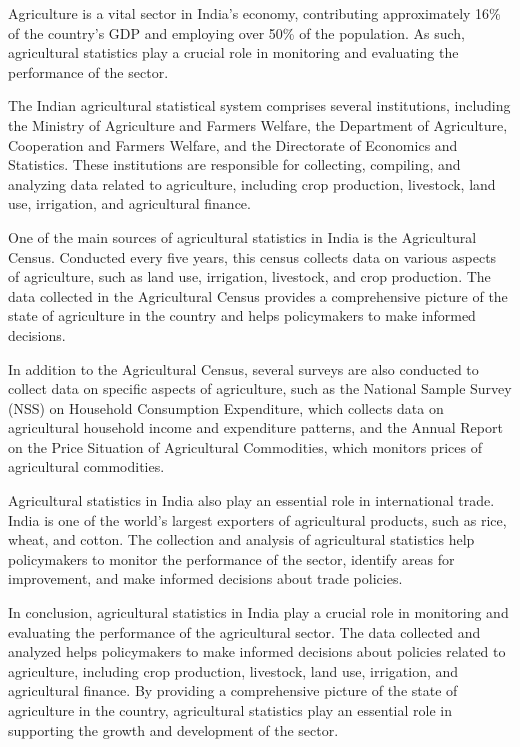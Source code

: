 \documentclass[
]{book}
\begin{document}
Agriculture is a vital sector in India's economy, contributing approximately 16\% of the country's GDP and employing over 50\% of the population. As such, agricultural statistics play a crucial role in monitoring and evaluating the performance of the sector.

The Indian agricultural statistical system comprises several institutions, including the Ministry of Agriculture and Farmers Welfare, the Department of Agriculture, Cooperation and Farmers Welfare, and the Directorate of Economics and Statistics. These institutions are responsible for collecting, compiling, and analyzing data related to agriculture, including crop production, livestock, land use, irrigation, and agricultural finance.

One of the main sources of agricultural statistics in India is the Agricultural Census. Conducted every five years, this census collects data on various aspects of agriculture, such as land use, irrigation, livestock, and crop production. The data collected in the Agricultural Census provides a comprehensive picture of the state of agriculture in the country and helps policymakers to make informed decisions.

In addition to the Agricultural Census, several surveys are also conducted to collect data on specific aspects of agriculture, such as the National Sample Survey (NSS) on Household Consumption Expenditure, which collects data on agricultural household income and expenditure patterns, and the Annual Report on the Price Situation of Agricultural Commodities, which monitors prices of agricultural commodities.

Agricultural statistics in India also play an essential role in international trade. India is one of the world's largest exporters of agricultural products, such as rice, wheat, and cotton. The collection and analysis of agricultural statistics help policymakers to monitor the performance of the sector, identify areas for improvement, and make informed decisions about trade policies.

In conclusion, agricultural statistics in India play a crucial role in monitoring and evaluating the performance of the agricultural sector. The data collected and analyzed helps policymakers to make informed decisions about policies related to agriculture, including crop production, livestock, land use, irrigation, and agricultural finance. By providing a comprehensive picture of the state of agriculture in the country, agricultural statistics play an essential role in supporting the growth and development of the sector.
\end{document}
